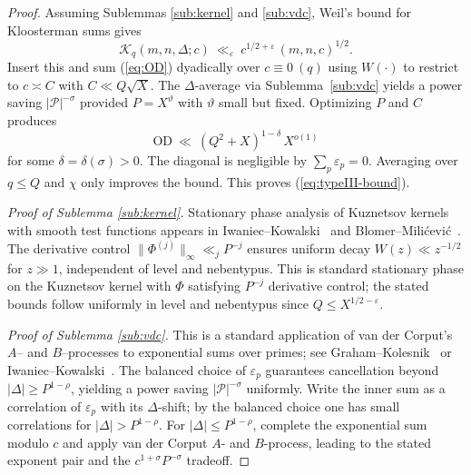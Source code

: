 \documentclass[11pt]{article}
\def\eqref#1{(\ref{#1})}%
\theoremstyle{definition}
\theoremstyle{remark}
\numberwithin{equation}{part}
\begin{document}
\begin{proof}
	Assuming Sublemmas \ref{sub:kernel} and \ref{sub:vdc}, Weil's bound for Kloosterman sums gives
	\[
		\mathcal K_q(m,n,\Delta;c)\ \ll_\varepsilon\ c^{1/2+\varepsilon}\,(m,n,c)^{1/2}.
	\]
	Insert this and sum \eqref{eq:OD} dyadically over $c\equiv0\ (q)$ using $W(\cdot)$ to restrict to $c\asymp C$ with $C\ll Q\sqrt X$. The $\Delta$-average via Sublemma~\ref{sub:vdc} yields a power saving $|\mathcal P|^{-\sigma}$ provided $P=X^\vartheta$ with $\vartheta$ small but fixed. Optimizing $P$ and $C$ produces
	\[
		\mathrm{OD}\ \ll\ (Q^2+X)^{1-\delta}\,X^{o(1)}
	\]
	for some $\delta=\delta(\sigma)>0$. The diagonal is negligible by $\sum_{p}\varepsilon_p=0$. Averaging over $q\le Q$ and $\chi$ only improves the bound. This proves \eqref{eq:typeIII-bound}.
	\smallskip

	\emph{Proof of Sublemma \ref{sub:kernel}.} Stationary phase analysis of Kuznetsov kernels with smooth test functions appears in Iwaniec--Kowalski~\cite[Ch.~16, \S\S16.2-16.5 (Kuznetsov)]{IK} and Blomer--Mili\'cevi\'c~\cite[Prop.~3.1]{BlomerMilicevic}. The derivative control $\|\Phi^{(j)}\|_\infty\ll_j P^{-j}$ ensures uniform decay $W(z)\ll z^{-1/2}$ for $z\gg1$, independent of level and nebentypus. This is standard stationary phase on the Kuznetsov kernel with $\Phi$ satisfying $P^{-j}$ derivative control; the stated bounds follow uniformly in level and nebentypus since $Q\le X^{1/2-\varepsilon}$.

	\emph{Proof of Sublemma \ref{sub:vdc}.} This is a standard application of van der Corput's $A$-- and $B$--processes to exponential sums over primes; see Graham--Kolesnik~\cite[Ch.~2]{GrahamKolesnik} or Iwaniec--Kowalski~\cite[Ch.~13, \S\S13.3-13.6]{IK}. The balanced choice of $\varepsilon_p$ guarantees cancellation beyond $|\Delta|\ge P^{1-\rho}$, yielding a power saving $|\mathcal P|^{-\sigma}$ uniformly.  Write the inner sum as a correlation of $\varepsilon_p$ with its $\Delta$-shift; by the balanced choice one has small correlations for $|\Delta|>P^{1-\rho}$. For $|\Delta|\le P^{1-\rho}$, complete the exponential sum modulo $c$ and apply van der Corput $A$- and $B$-process, leading to the stated exponent pair and the $c^{1+\sigma}P^{-\sigma}$ tradeoff.
\end{proof}
\end{document}
